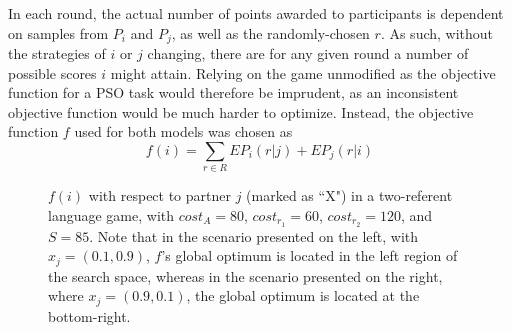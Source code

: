 \documentclass[12pt,a4paper]{article}
\begin{document}
In each round, the actual number of points awarded to participants is dependent on samples from $P_i$ and $P_j$, as well as the randomly-chosen $r$. As such, without the strategies of $i$ or $j$ changing, there are for any given round a number of possible scores $i$ might attain. Relying on the game unmodified as the objective function for a PSO task would therefore be imprudent, as an inconsistent objective function would be much harder to optimize. Instead, the objective function $f$ used for both models was chosen as 
\begin{equation}
f(i) = \sum_{r \in R} EP_{i}(r|j) + EP_{j}(r|i)
\end{equation}

\begin{figure}
\centering
\scalebox{.725}{}
\caption{$f(i)$ with respect to partner $j$ (marked as ``X") in a two-referent language game, with $cost_A=80$, $cost_{r_1}=60$, $cost_{r_2}=120$, and $S=85$. Note that in the scenario presented on the left, with $x_j = (0.1, 0.9)$, $f$'s global optimum is located in the left region of the search space, whereas in the scenario presented on the right, where $x_j = (0.9, 0.1)$, the global optimum is located at the bottom-right.}
\label{fig:1}
\end{figure}
\end{document}
